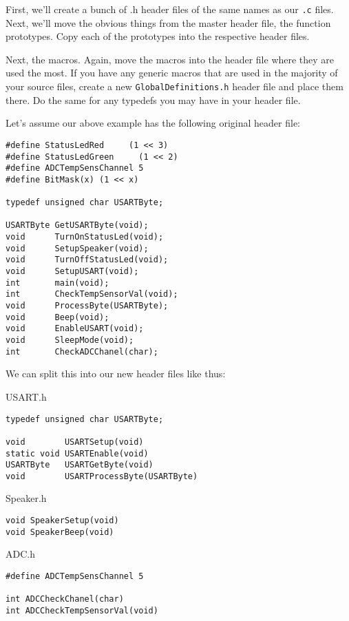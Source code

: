 \documentclass[a4paper,oneside]{book}
\begin{document}
First, we'll create a bunch of .h header files of the same names as our \texttt{.c} files. Next, we'll move the obvious things from the master header file, the function prototypes. Copy each of the prototypes into the respective header files.

Next, the macros. Again, move the macros into the header file where they are used the most. If you have any generic macros that are used in the majority of your source files, create a new \texttt{GlobalDefinitions.h} header file and place them there. Do the same for any typedefs you may have in your header file.

Let's assume our above example has the following original header file:

\begin{center}
\begin{lstlisting}
#define StatusLedRed     (1 << 3)
#define StatusLedGreen     (1 << 2)
#define ADCTempSensChannel 5
#define BitMask(x) (1 << x)

typedef unsigned char USARTByte;

USARTByte GetUSARTByte(void);
void      TurnOnStatusLed(void);
void      SetupSpeaker(void);
void      TurnOffStatusLed(void);
void      SetupUSART(void);
int       main(void);
int       CheckTempSensorVal(void);
void      ProcessByte(USARTByte);
void      Beep(void);
void      EnableUSART(void);
void      SleepMode(void);
int       CheckADCChanel(char);
\end{lstlisting}
\end{center}

We can split this into our new header files like thus:

USART.h
\begin{center}
\begin{lstlisting}
typedef unsigned char USARTByte;

void        USARTSetup(void)
static void USARTEnable(void)
USARTByte   USARTGetByte(void)
void        USARTProcessByte(USARTByte)
\end{lstlisting}
\end{center}

Speaker.h
\begin{center}
\begin{lstlisting}
void SpeakerSetup(void)
void SpeakerBeep(void)
\end{lstlisting}
\end{center}

ADC.h
\begin{center}
\begin{lstlisting}
#define ADCTempSensChannel 5

int ADCCheckChanel(char)
int ADCCheckTempSensorVal(void)
\end{lstlisting}
\end{center}
\end{document}
